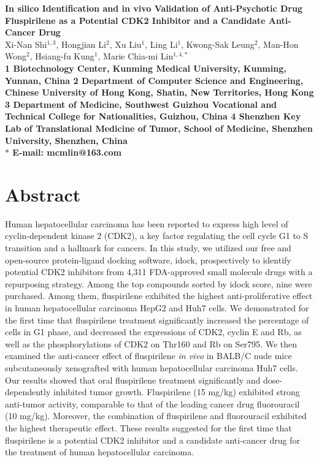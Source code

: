 \documentclass[10pt]{article}
\date{}
\begin{document}
\begin{flushleft}
{\Large
\textbf{In silico Identification and in vivo Validation of Anti-Psychotic Drug Fluspirilene as a Potential CDK2 Inhibitor and a Candidate Anti-Cancer Drug}
}
\\
Xi-Nan Shi$^{1,3}$,
Hongjian Li$^{2}$,
Xu Liu$^{1}$,
Ling Li$^{1}$,
Kwong-Sak Leung$^{2}$,
Man-Hon Wong$^{2}$,
Hsiang-fu Kung$^{1}$,
Marie Chia-mi Lin$^{1,4,\ast}$
\\
\bf{1} Biotechnology Center, Kunming Medical University, Kunming, Yunnan, China
\bf{2} Department of Computer Science and Engineering, Chinese University of Hong Kong, Shatin, New Territories, Hong Kong
\bf{3} Department of Medicine, Southwest Guizhou Vocational and Technical College for Nationalities, Guizhou, China
\bf{4} Shenzhen Key Lab of Translational Medicine of Tumor, School of Medicine, Shenzhen University, Shenzhen, China
\\
$\ast$ E-mail: mcmlin@163.com
\end{flushleft}

\section*{Abstract}
Human hepatocellular carcinoma has been reported to express high level of cyclin-dependent kinase 2 (CDK2), a key factor regulating the cell cycle G1 to S transition and a hallmark for cancers. In this study, we utilized our free and open-source protein-ligand docking software, idock, prospectively to identify potential CDK2 inhibitors from 4,311 FDA-approved small molecule drugs with a repurposing strategy. Among the top compounds sorted by idock score, nine were purchased. Among them, fluspirilene exhibited the highest anti-proliferative effect in human hepatocellular carcinoma HepG2 and Huh7 cells. We demonstrated for the first time that fluspirilene treatment significantly increased the percentage of cells in G1 phase, and decreased the expressions of CDK2, cyclin E and Rb, as well as the phosphorylations of CDK2 on Thr160 and Rb on Ser795. We then examined the anti-cancer effect of fluspirilene \textit{in vivo} in BALB/C nude mice subcutaneously xenografted with human hepatocellular carcinoma Huh7 cells. Our results showed that oral fluspirilene treatment significantly and dose-dependently inhibited tumor growth. Fluspirilene (15 mg/kg) exhibited strong anti-tumor activity, comparable to that of the leading cancer drug fluorouracil (10 mg/kg). Moreover, the combination of fluspirilene and fluorouracil exhibited the highest therapeutic effect. These results suggested for the first time that fluspirilene is a potential CDK2 inhibitor and a candidate anti-cancer drug for the treatment of human hepatocellular carcinoma.
\end{document}
